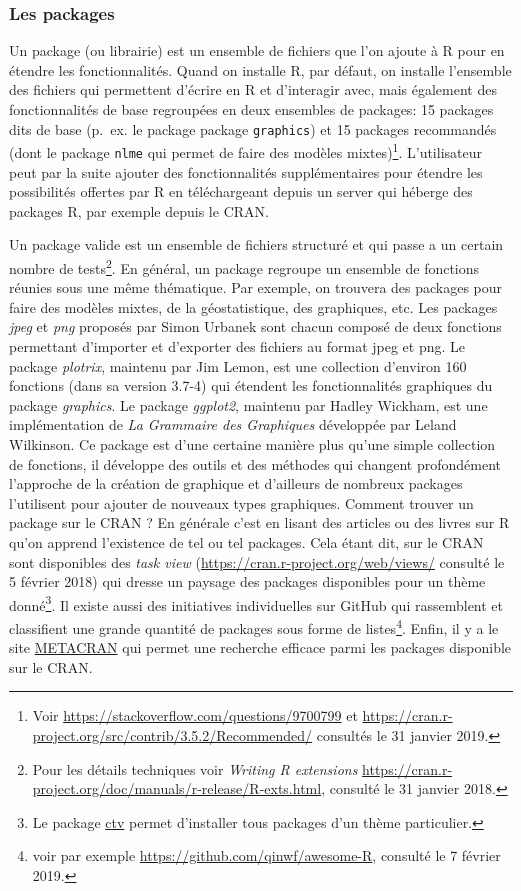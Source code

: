 \documentclass[]{article}
\begin{document}
\hypertarget{les-packages}{%
\subsubsection{Les packages}\label{les-packages}}

Un package (ou librairie) est un ensemble de fichiers que l'on ajoute à R pour en
étendre les fonctionnalités. Quand on installe R, par défaut, on installe l'ensemble des fichiers qui permettent d'écrire en R et d'interagir avec, mais également des fonctionnalités de base regroupées en deux ensembles de packages: 15 packages dits de base (p.~ex. le package package \texttt{graphics}) et 15 packages recommandés (dont le package \texttt{nlme} qui permet de faire des modèles mixtes)\footnote{Voir \url{https://stackoverflow.com/questions/9700799} et \url{https://cran.r-project.org/src/contrib/3.5.2/Recommended/} consultés le 31 janvier 2019.}. L'utilisateur peut par la suite ajouter des fonctionnalités supplémentaires pour étendre les possibilités offertes par R en téléchargeant depuis un server qui héberge des packages R, par exemple depuis le CRAN.

Un package valide est un ensemble de fichiers structuré et qui passe a un certain nombre de tests\footnote{Pour les détails techniques voir \emph{Writing R extensions} \url{https://cran.r-project.org/doc/manuals/r-release/R-exts.html}, consulté le 31 janvier 2018.}. En général, un package regroupe un ensemble de fonctions réunies sous une même thématique. Par exemple, on trouvera des packages pour faire des modèles mixtes, de la géostatistique, des graphiques, etc. Les packages \emph{jpeg} et \emph{png} proposés par Simon Urbanek sont chacun composé de deux fonctions permettant d'importer et d'exporter des fichiers au format jpeg et png. Le package \emph{plotrix}, maintenu par Jim Lemon, est une collection d'environ 160 fonctions (dans sa version 3.7-4) qui étendent les fonctionnalités graphiques du package \emph{graphics}. Le package \emph{ggplot2}, maintenu par Hadley Wickham, est une implémentation de \emph{La Grammaire des Graphiques} développée par Leland Wilkinson. Ce package est d'une certaine manière plus qu'une simple collection de fonctions, il développe des outils et des méthodes qui changent profondément l'approche de la création de graphique et d'ailleurs de nombreux packages l'utilisent pour ajouter de nouveaux types graphiques. Comment trouver un package sur le CRAN ? En générale c'est en lisant des articles ou des livres sur R qu'on apprend l'existence de tel ou tel packages. Cela étant dit, sur le CRAN sont disponibles des \emph{task view} (\url{https://cran.r-project.org/web/views/} consulté le 5 février 2018) qui dresse un paysage des packages disponibles pour un thème donné\footnote{Le package \href{https://cran.r-project.org/web/packages/ctv/}{ctv} permet d'installer tous packages d'un thème particulier.}. Il existe aussi des initiatives individuelles sur GitHub qui rassemblent et classifient une grande quantité de packages sous forme de listes\footnote{voir par exemple \url{https://github.com/qinwf/awesome-R}, consulté le 7 février 2019.}. Enfin, il y a le site \href{https://www.r-pkg.org/}{METACRAN} qui permet une recherche efficace parmi les packages disponible sur le CRAN.
\end{document}
